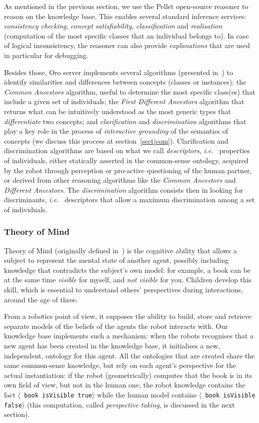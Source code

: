 \documentclass[preprint,3p,times]{elsarticle}
\newcommand{\stmt}[1]{{\footnotesize \tt $\langle$ #1\relax$\rangle$}}
\newcommand{\ie}{{\textit{i.e.\ }}}
\begin{document}
As mentioned in the previous section, we use the Pellet open-source reasoner to
reason on the knowledge base. This enables several standard inference services:
\emph{consistency checking}, \emph{concept satisfiability},
\emph{classification} and \emph{realisation} (computation of the most specific
classes that an individual belongs to). In case of logical inconsistency, the
reasoner can also provide \emph{explanations} that are used in particular for
debugging.

Besides those, {\sc Oro} server implements several algorithms (presented
in~\cite{Ros2010b}) to identify
similarities and differences between concepts (classes or
instances): the \emph{Common Ancestors} algorithm, useful to
determine the most specific class(es) that include a given set of individuals;
the \emph{First Different Ancestors} algorithm that returns what can be
intuitively understood as the most generic types that \emph{differentiate} two
concepts; and \emph{clarification} and \emph{discrimination} algorithms that
play a key role in the process of \emph{interactive grounding} of the semantics
of concepts (we discuss this process at section~\ref{sect|com}). Clarification
and discrimination algorithms are based on what we call \emph{descriptors}, \ie
properties of individuals, either statically asserted in the common-sense
ontology, acquired by the robot through perception or pro-active questioning of
the human partner, or derived from other reasoning algorithms like the
\emph{Common Ancestors} and \emph{Different Ancestors}. The
\emph{discrimination} algorithm consists then in looking for discriminants, \ie
descriptors that allow a maximum discrimination among a set of individuals.

\subsubsection{Theory of Mind}
\label{sect|tom}

Theory of Mind (originally defined in~\cite{Premack1978}) is the cognitive
ability that allows a subject to represent the mental state of another
agent, possibly including knowledge that contradicts the subject's own model: for
example, a book can be at the same time \emph{visible} for myself, and \emph{not
visible} for you. Children develop this skill, which is essential to understand others' perspectives during
interactions, around the age of three. 

From a robotics point of view, it supposes the ability to build, store and
retrieve separate models of the beliefs of the agents the robot interacts with.
Our knowledge base implements such a mechanism: when the robots recognises that
a new agent has been created in the knowledge base, it initialises a new,
independent, ontology for this agent. All the ontologies that are created share
the same common-sense knowledge, but rely on each agent's perspective for the
actual instantiation: if the robot (geometrically) computes that the book is in its
own field of view, but not in the human one, the robot knowledge contains the
fact \stmt{book isVisible true} while the human model contains \stmt{book
isVisible false} (this computation, called \emph{perspective taking}, is
discussed in the next section).
\end{document}
